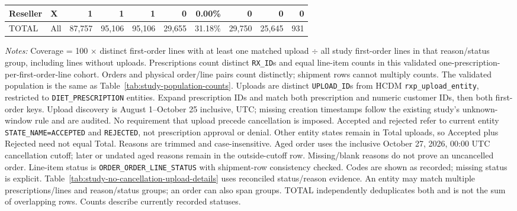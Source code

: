 \begin{landscape}
\begin{table}[!htbp]
\begin{tabular}{@{}llrrrrrrrr@{}}
{Reseller} & X & 1 & 1 & 1 & 0 & 0.00\% & 0 & 0 & 0 \\
\midrule
{TOTAL} & All & 87,757 & 95,106 & 95,106 & 29,655 & 31.18\% & 29,750 & 25,645 & 931 \\
\bottomrule
\end{tabular}
\begin{minipage}{\linewidth}
\footnotesize
\textit{Notes:} Coverage = 100 $\times$ distinct first-order lines with at least
one matched upload $\div$ all study first-order lines in that reason/status group, including
lines without uploads. Prescriptions count distinct \texttt{RX\_ID}s and equal
line-item counts in this validated one-prescription-per-first-order-line cohort.
Orders and physical order/line pairs count distinctly;
shipment rows cannot multiply counts. The validated population is the same as
Table~\ref{tab:study-population-counts}.
Uploads are distinct \texttt{UPLOAD\_ID}s from HCDM
\texttt{rxp\_upload\_entity}, restricted to \texttt{DIET\_PRESCRIPTION} entities.
Expand prescription IDs and match both prescription and numeric customer IDs,
then both first-order keys. Upload discovery is August 1--October 25 inclusive,
UTC; missing creation timestamps follow the existing study's unknown-window rule
and are audited. No requirement that upload precede cancellation is imposed.
Accepted and rejected refer to current entity \texttt{STATE\_NAME=ACCEPTED} and
\texttt{REJECTED}, not prescription approval or denial. Other entity states
remain in Total uploads, so Accepted plus Rejected need not equal Total.
Reasons are trimmed and case-insensitive. Aged order uses the inclusive
October 27, 2026, 00:00 UTC cancellation cutoff; later or undated aged reasons
remain in the outside-cutoff row. Missing/blank reasons do not prove an uncancelled
order. Line-item status is \texttt{ORDER\_ORDER\_LINE\_STATUS} with shipment-row consistency checked.
Codes are shown as recorded; missing status is explicit. Table~\ref{tab:study-no-cancellation-upload-details}
uses reconciled status/reason evidence.
An entity may match multiple prescriptions/lines and reason/status groups;
an order can also span groups. TOTAL independently deduplicates both and is not
the sum of overlapping rows. Counts describe currently recorded statuses.
\end{minipage}
\end{table}
\end{landscape}

